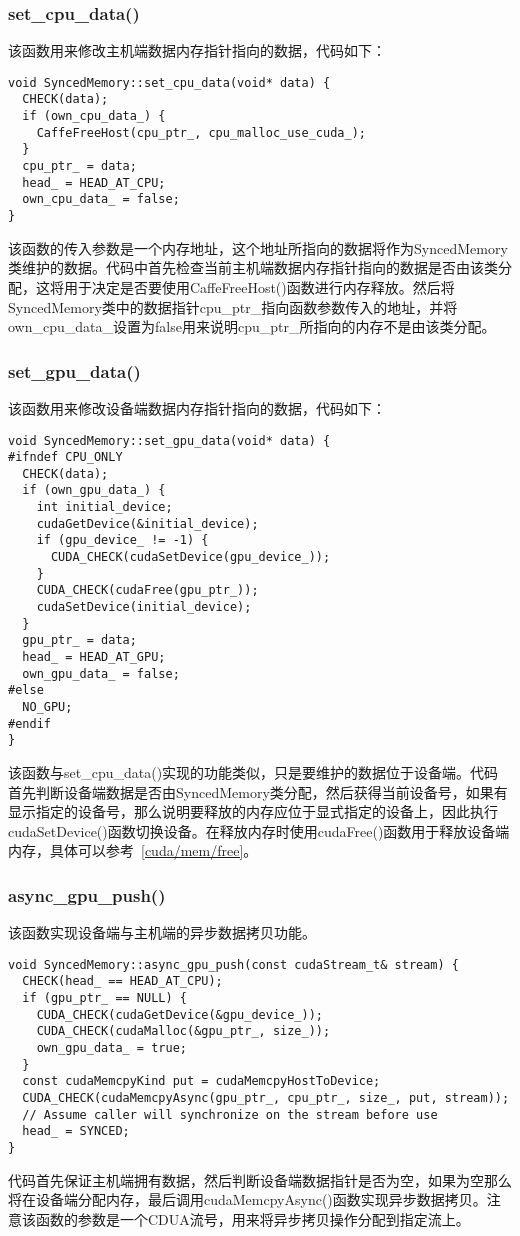 \subsubsection{set\_cpu\_data()}
该函数用来修改主机端数据内存指针指向的数据，代码如下：
\begin{verbatim}
void SyncedMemory::set_cpu_data(void* data) {
  CHECK(data);
  if (own_cpu_data_) {
    CaffeFreeHost(cpu_ptr_, cpu_malloc_use_cuda_);
  }
  cpu_ptr_ = data;
  head_ = HEAD_AT_CPU;
  own_cpu_data_ = false;
}
\end{verbatim}
该函数的传入参数是一个内存地址，这个地址所指向的数据将作为SyncedMemory类维护的数据。代码中首先检查当前主机端数据内存指针指向的数据是否由该类分配，这将用于决定是否要使用CaffeFreeHost()函数进行内存释放。然后将SyncedMemory类中的数据指针cpu\_ptr\_指向函数参数传入的地址，并将own\_cpu\_data\_设置为false用来说明cpu\_ptr\_所指向的内存不是由该类分配。
\subsubsection{set\_gpu\_data()}
该函数用来修改设备端数据内存指针指向的数据，代码如下：
\begin{verbatim}
void SyncedMemory::set_gpu_data(void* data) {
#ifndef CPU_ONLY
  CHECK(data);
  if (own_gpu_data_) {
    int initial_device;
    cudaGetDevice(&initial_device);
    if (gpu_device_ != -1) {
      CUDA_CHECK(cudaSetDevice(gpu_device_));
    }
    CUDA_CHECK(cudaFree(gpu_ptr_));
    cudaSetDevice(initial_device);
  }
  gpu_ptr_ = data;
  head_ = HEAD_AT_GPU;
  own_gpu_data_ = false;
#else
  NO_GPU;
#endif
}
\end{verbatim}
该函数与set\_cpu\_data()实现的功能类似，只是要维护的数据位于设备端。代码首先判断设备端数据是否由SyncedMemory类分配，然后获得当前设备号，如果有显示指定的设备号，那么说明要释放的内存应位于显式指定的设备上，因此执行cudaSetDevice()函数切换设备。在释放内存时使用cudaFree()函数用于释放设备端内存，具体可以参考~\ref{cuda/mem/free}。
\subsubsection{async\_gpu\_push()}
该函数实现设备端与主机端的异步数据拷贝功能。
\begin{verbatim}
void SyncedMemory::async_gpu_push(const cudaStream_t& stream) {
  CHECK(head_ == HEAD_AT_CPU);
  if (gpu_ptr_ == NULL) {
    CUDA_CHECK(cudaGetDevice(&gpu_device_));
    CUDA_CHECK(cudaMalloc(&gpu_ptr_, size_));
    own_gpu_data_ = true;
  }
  const cudaMemcpyKind put = cudaMemcpyHostToDevice;
  CUDA_CHECK(cudaMemcpyAsync(gpu_ptr_, cpu_ptr_, size_, put, stream));
  // Assume caller will synchronize on the stream before use
  head_ = SYNCED;
}
\end{verbatim}
代码首先保证主机端拥有数据，然后判断设备端数据指针是否为空，如果为空那么将在设备端分配内存，最后调用cudaMemcpyAsync()函数实现异步数据拷贝。注意该函数的参数是一个CDUA流号，用来将异步拷贝操作分配到指定流上。